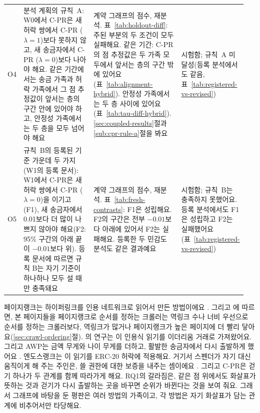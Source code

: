 {\begin{longtable}{@{}>{\raggedright\arraybackslash}p{0.05\linewidth}>{\raggedright\arraybackslash}p{0.34\linewidth}>{\raggedright\arraybackslash}p{0.39\linewidth}>{\raggedright\arraybackslash}p{0.17\linewidth}@{}}
\addlinespace
O4 & 분석 계획의 규칙~A: W0에서 \mbox{C-PR}은 새 허락 쌍에서 \mbox{C-PR} ($\lambda=1$)보다 못하지 않고, 새 송금자에서 \mbox{C-PR} ($\lambda=0$)보다 나아야 해요. 같은 기간에서는 송금 가족과 허락 가족에서 그 점 추정값이 앞서는 층의 구간 안에 있어야 하고, 안정성 가족에서는 두 층을 모두 넘어야 해요 & 계약 그래프의 점수, 재분석. 표~\ref{tab:holdout-diff}: 주된 부분의 두 조건이 모두 실패해요. 같은 기간: \mbox{C-PR}의 점 추정값은 두 가족 모두에서 앞서는 층의 구간 밖에 있어요(표~\ref{tab:alignment-hybrid}). 안정성 가족에서는 두 층 사이에 있어요(표~\ref{tab:tau-diff-hybrid}). \ref{sec:coupled-results}절과 \ref{sub:cpr-rule-a}절을 봐요 & 시험함; 규칙~A 미달성(등록 분석에서도 같음, 표~\ref{tab:registered-vs-revised}) \\
\addlinespace
O5 & 규칙~B의 등록된 기준 가운데 두 가지(W1의 등록 문서): W1에서 \mbox{C-PR}은 새 허락 쌍에서 \mbox{C-PR} ($\lambda=0$)을 이기고(F1), 새 송금자에서 0.01보다 더 많이 나쁘지 않아야 해요(F2: 95\% 구간의 아래 끝이 $-0.01$보다 위). 등록 문서에 따르면 규칙 B는 자기 기준이 하나하나 모두 설 때만 충족돼요 & 계약 그래프의 점수, 재분석. 표~\ref{tab:fresh-contrasts}: F1은 성립해요. F2의 구간은 전부 $-0.01$보다 아래에 있어서 F2는 실패해요. 등록한 두 민감도 분석도 같은 결과예요 & 시험함; 규칙~B는 충족하지 못했어요. 등록 분석에서도 F1은 성립하고 F2는 실패했어요(표~\ref{tab:registered-vs-revised}) \\
\end{longtable}
}



페이지랭크는 하이퍼링크를 인용 네트워크로 읽어서 만든 방법이에요 \parencite{page1999pagerank}. 그리고 \textcite{cho1998crawling}에 따르면, 본 페이지들을 페이지랭크로 순서를 정하는 크롤러는 역링크 수나 너비 우선으로 순서를 정하는 크롤러보다, 역링크가 많거나 페이지랭크가 높은 페이지에 더 빨리 닿아요(\ref{sec:crawl-ordering}절). \textcite{do2023hodgerank}의 연구는 이 인용식 읽기를 이더리움 거래로 가져왔어요. 그리고 AWP는 금액 무게와 나이 무게를 더하고, 활발한 송금자에서 다시 출발하게 했어요 \parencite{do2023awp}. 엔도스랭크는 이 읽기를 ERC-20 허락에 적용해요. 거기서 스펜더가 자기 대신 움직이게 해 주는 주인은, 쓸 권한에 대한 보증을 내주는 셈이에요 \parencite{vogelsteller2015erc20}. 그리고 \mbox{C-PR}은 걷기 하나가 두 관계를 함께 따라가게 해요. RQ1의 갈라짐은, 같은 점 위에서도 화살표가 뜻하는 것과 걷기가 다시 출발하는 곳을 바꾸면 순위가 바뀐다는 것을 보여 줘요. 그래서 그래프에 바탕을 둔 평판은 여러 방법의 가족이고, 각 방법은 자기 화살표가 담는 관계에 비추어서만 타당해요.


